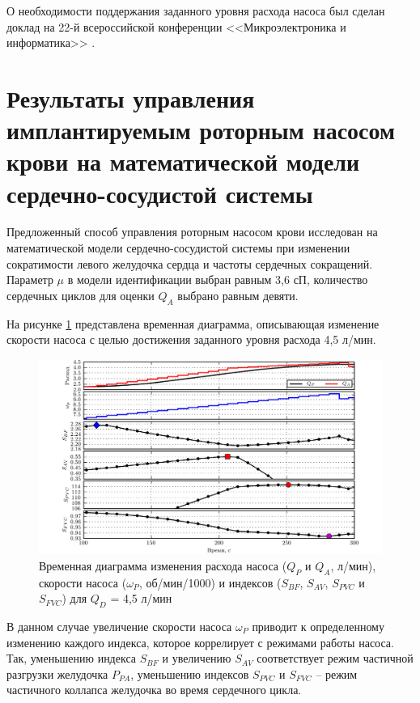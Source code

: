 О необходимости поддержания заданного уровня расхода насоса был сделан доклад на 22-й всероссийской конференции <<Микроэлектроника и информатика>> \cite{miee_2015}. 

\section*{Результаты управления имплантируемым роторным насосом крови на математической модели сердечно-сосудистой системы}

Предложенный способ управления роторным насосом крови исследован на математической модели сердечно-сосудистой системы при изменении сократимости левого желудочка сердца и частоты сердечных сокращений. Параметр $\mu$ в модели идентификации выбран равным 3,6 сП, количество сердечных циклов для оценки $Q_A$ выбрано равным девяти.

На рисунке \ref{img:pump_ramp_for_Qd} представлена временная диаграмма, описывающая изменение скорости насоса с целью достижения заданного уровня расхода 4,5 л/мин. 

\begin{figure}[ht] 
  \center
  \includegraphics [scale=1.0] {../images/c3_waveform_pumping_states}
  \caption{Временная диаграмма изменения расхода насоса ($Q_P$ и $Q_A$, л/мин), скорости насоса ($\omega_P$, об/мин/1000) и индексов ($S_{BF}$, $S_{AV}$, $S_{PVC}$ и $S_{FVC}$) для $Q_D$ = 4,5 л/мин} 
  \label{img:pump_ramp_for_Qd}  
\end{figure}

В данном случае увеличение скорости насоса $\omega_P$ приводит к определенному изменению каждого индекса, которое коррелирует с режимами работы насоса. Так, уменьшению индекса $S_{BF}$ и увеличению $S_{AV}$ соответствует режим частичной разгрузки желудочка $P_{PA}$, уменьшению индексов $S_{PVC}$ и $S_{FVC}$ -- режим частичного коллапса желудочка во время сердечного цикла. 

